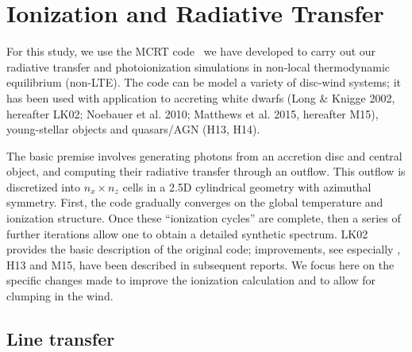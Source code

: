 \documentclass[useAMS,usenatbib]{mn2e_x}
\begin{document}

\section{Ionization and Radiative Transfer}

For this study, we use the MCRT code \py\ we have developed to carry out our 
radiative transfer and photoionization simulations in non-local thermodynamic
equilibrium (non-LTE). The code can be model a variety of
disc-wind systems; it has been used with application to accreting white dwarfs 
(Long \& Knigge 2002, hereafter LK02; Noebauer et al. 2010; 
Matthews et al. 2015, hereafter M15), young-stellar objects 
\citep{simmacro2005} and quasars/AGN (H13, H14).\nocite{noebauer, M15, LK02}  

The basic premise involves generating photons from an accretion disc
and central object, and computing their radiative transfer through an outflow.
This outflow is discretized into $n_x \times n_z$ cells in a 2.5D
cylindrical geometry with azimuthal symmetry.
First, the code gradually converges on the global temperature and ionization structure.
Once these ``ionization cycles'' are complete, then a series of further iterations
allow one to obtain a detailed synthetic spectrum.
LK02 provides the basic description of the original code; improvements, 
see especially \cite{simmacro2005}, H13 and M15, have been 
described in subsequent reports.  
We focus here on the specific changes made to improve the ionization calculation 
and to allow for clumping in the wind.


\subsection{Line transfer}
\end{document}
